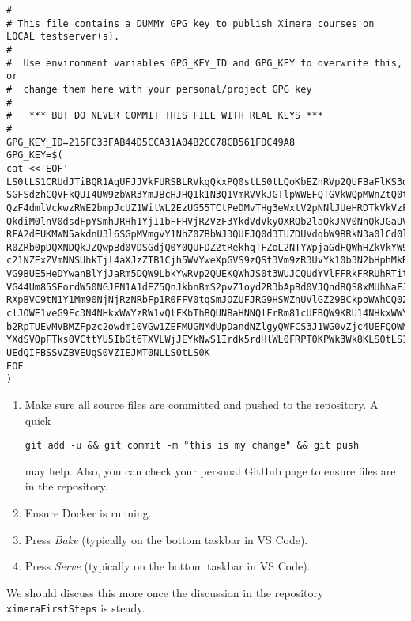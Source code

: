 \documentclass{ximera}
\begin{document}
 {\small\begin{verbatim}
#
# This file contains a DUMMY GPG key to publish Ximera courses on LOCAL testserver(s).
#
#  Use environment variables GPG_KEY_ID and GPG_KEY to overwrite this, or 
#  change them here with your personal/project GPG key
#
#   *** BUT DO NEVER COMMIT THIS FILE WITH REAL KEYS ***
#
GPG_KEY_ID=215FC33FAB44D5CCA31A04B2CC78CB561FDC49A8
GPG_KEY=$(
cat <<'EOF'
LS0tLS1CRUdJTiBQR1AgUFJJVkFURSBLRVkgQkxPQ0stLS0tLQoKbEZnRVp2QUFBaFlKS3dZQkJB
SGFSdzhCQVFkQUI4UW9zbWR3YmJBcHJHQ1k1N3Q1VmRVVkJGTlpWWEFQTGVkWQpMWnZtQ0tjQUFR
QzF4dmlVckwzRWE2bmpJcUZ1WitWL2EzUG55TCtPeDMvTHg3eWxtV2pNNlJUeHRDTkVkVzF0CmVT
QkdiM0lnV0dsdFpYSmhJRHh1YjI1bFFHVjRZVzF3YkdVdVkyOXRQb2laQkJNV0NnQkJGaUVFSVYv
RFA2dEUKMWN5akdnU3l6SGpMVmgvY1NhZ0ZBbWJ3QUFJQ0d3TUZDUVdqbW9BRkN3a0lCd0lDSWdJ
R0ZRb0pDQXNDQkJZQwpBd0VDSGdjQ0Y0QUFDZ2tRekhqTFZoL2NTYWpjaGdFQWhHZkVkYW9xRnZD
c21NZExZVmNNSUhkTjl4aXJzZTB1Cjh5WVYweXpGVS9zQSt3Vm9zR3UvYk10b3N2bHphMkRJUkQ3
VG9BUE5HeDYwanBlYjJaRm5DQW9LbkYwRVp2QUEKQWhJS0t3WUJCQUdYVlFFRkFRRUhRTitNMW52
VG44Um85SFordW50NGJFN1A1dEZ5QnJkbnBmS2pvZ1oyd2R3bApBd0VJQndBQS8xMUhNaFJuTnFL
RXpBVC9tN1Y1Mm90NjNjRzNRbFp1R0FFV0tqSmJOZUFJRG9HSWZnUVlGZ29BCkpoWWhCQ0Zmd3or
clJOWE1veG9Fc3N4NHkxWWYzRW1vQlFKbThBQUNBaHNNQlFrRm81cUFBQW9KRU14NHkxWWYKM0Vt
b2RpTUEvMVBMZFpzc2owdm10VGw1ZEFMUGNMdUpDandNZlgyQWFCS3J1WG0vZjc4UEFQOWM2eHdh
YXdSVQpFTks0VCttYU5IbGt6TXVLWjJEYkNwS1Irdk5rdHlWL0FRPT0KPWk3Wk8KLS0tLS1FTkQg
UEdQIFBSSVZBVEUgS0VZIEJMT0NLLS0tLS0K
EOF
)
\end{verbatim}
 }

\begin{enumerate}
    \item Make sure all source files are committed and pushed to the
          repository. A quick
          \begin{verbatim}
git add -u && git commit -m "this is my change" && git push
\end{verbatim}
          may help. Also, you can check your personal GitHub page to ensure
          files are in
          the repository.
    \item Ensure Docker is running.
    \item Press \textit{Bake} (typically on the bottom taskbar in VS Code).
    \item Press \textit{Serve} (typically on the bottom taskbar in VS Code).
\end{enumerate}

We should discuss this more once the discussion in the repository
\verb!ximeraFirstSteps! is steady.
\end{document}

